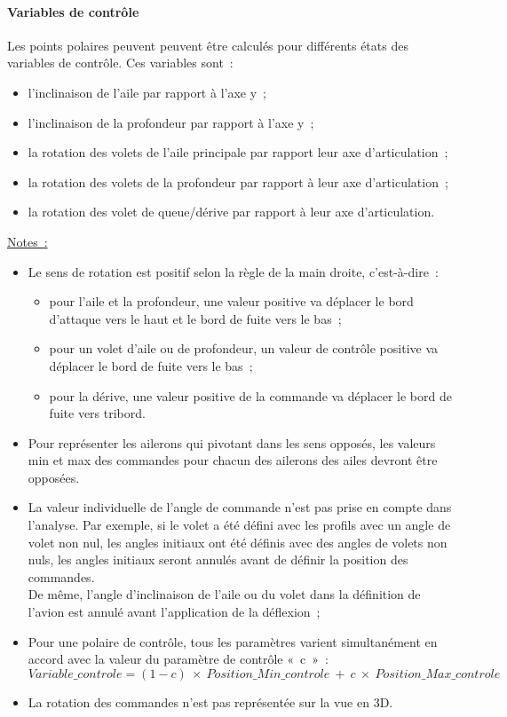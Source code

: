 \documentclass[a4paper,twoside,12pt,dvips]{article}
\begin{document}
\paragraph{Variables de contrôle}

Les points polaires peuvent peuvent être calculés pour différents états
des variables de contrôle. Ces variables sont~:

\begin{itemize}
  \item l’inclinaison de l’aile par rapport à l’axe y~;
  \item l’inclinaison de la profondeur par rapport à l’axe y~;
  \item la rotation des volets de l’aile principale par rapport leur axe
  d’articulation~;
  \item la rotation des volets de la profondeur par rapport à leur axe
  d’articulation~;
  \item la rotation des volet de queue/dérive par rapport à leur axe
  d’articulation.
\end{itemize}

\underline{Notes~:}

\begin{itemize}
	\item Le sens de rotation est positif selon la règle de la main droite, 
	c’est-à-dire~:
	\begin{itemize}
		\item pour l’aile et la profondeur, une valeur positive va déplacer le 
		bord d’attaque vers le haut et le bord de fuite vers le bas~;
		\item pour un volet d’aile ou de profondeur, un valeur de contrôle 
		positive va déplacer le bord de fuite vers le bas~;
		\item pour la dérive, une valeur positive de la commande va déplacer le
		bord de fuite vers tribord.
	\end{itemize}
	
	\item Pour représenter les ailerons qui pivotant dans les sens opposés, les 
	valeurs min et max des commandes pour chacun des ailerons des ailes devront 
	être opposées.
	\item La valeur individuelle de l’angle de commande n’est pas prise en 
	compte dans l’analyse. Par exemple, si le volet a été défini avec les 
	profils avec un angle de volet non nul, les angles initiaux ont été définis
	avec des  angles de volets non nuls, les angles initiaux seront annulés 
	avant de définir la position des commandes.\\
	De même, l’angle d’inclinaison de l’aile ou du volet dans la définition de 
	l’avion est annulé avant l’application de la déflexion~;
	\item Pour une polaire de contrôle, tous les paramètres varient 
	simultanément en accord avec la valeur du paramètre de contrôle «~c~»~:
	$$Variable\_controle = (1-c)~\times~Position\_Min\_controle~+~c
	~\times~Position\_Max\_controle$$
	\item La rotation des commandes n’est pas représentée sur la vue en 3D.
\end{itemize}
\end{document}
